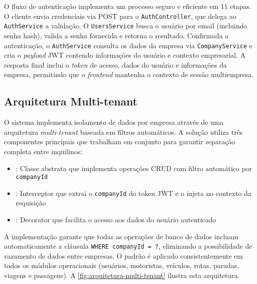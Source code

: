 O fluxo de autenticação implementa um processo seguro e eficiente em 11 etapas. O cliente envia credenciais via POST para o \texttt{AuthController}, que delega ao \texttt{AuthService} a validação. O \texttt{UsersService} busca o usuário por email (incluindo senha hash), valida a senha fornecida e retorna o resultado. Confirmada a autenticação, o \texttt{AuthService} consulta os dados da empresa via \texttt{CompanyService} e cria o \textit{payload} JWT contendo informações do usuário e contexto empresarial. A resposta final inclui o \textit{token} de acesso, dados do usuário e informações da empresa, permitindo que o \textit{frontend} mantenha o contexto de sessão multiempresa.

\subsection{Arquitetura Multi-tenant}

O sistema implementa isolamento de dados por empresa através de uma arquitetura \textit{multi-tenant} baseada em filtros automáticos. A solução utiliza três componentes principais que trabalham em conjunto para garantir separação completa entre inquilinos:

\begin{itemize}
  \item {}: Classe abstrata que implementa operações CRUD com filtro automático por \texttt{companyId}
  \item {}: Interceptor que extrai o \texttt{companyId} do token JWT e o injeta no contexto da requisição
  \item {}: Decorator que facilita o acesso aos dados do usuário autenticado
\end{itemize}

A implementação garante que todas as operações de banco de dados incluam automaticamente a cláusula \texttt{WHERE companyId = ?}, eliminando a possibilidade de vazamento de dados entre empresas. O padrão é aplicado consistentemente em todos os módulos operacionais (usuários, motoristas, veículos, rotas, paradas, viagens e passagens). A \autoref{fig:arquitetura-multi-tenant} ilustra esta arquitetura.

